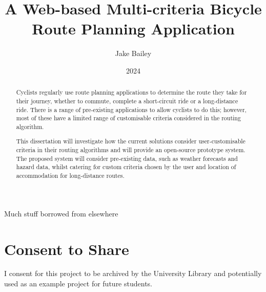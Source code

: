 \documentclass[bsc]{abdnthesis}
\title{A Web-based Multi-criteria Bicycle Route Planning Application}
\author{Jake Bailey}
\date{2024}
\begin{document}

\maketitle
\makedeclaration


\begin{abstract}
    Cyclists regularly use route planning applications to determine the route they take for their journey, whether to commute, complete a short-circuit ride or a long-distance ride. There is a range of pre-existing applications to allow cyclists to do this; however, most of these have a limited range of customisable criteria considered in the routing algorithm.

    This dissertation will investigate how the current solutions consider user-customisable criteria in their routing algorithms and will provide an open-source prototype system. The proposed system will consider pre-existing data, such as weather forecasts and hazard data, whilst catering for custom criteria chosen by the user and location of accommodation for long-distance routes.
\end{abstract}

\begin{acknowledgements}
  Much stuff borrowed from elsewhere
\end{acknowledgements}

\section*{Consent to Share}
I consent for this project to be archived by the University Library and potentially used as an example project for future students.



\newcommand{\autorefp}[1]{\autoref{#1} (p\pageref*{#1})}

\newcommand{\autorefnp}[1]{\autoref{#1} ``\nameref{#1}'', (p\pageref*{#1})}
\end{document}
